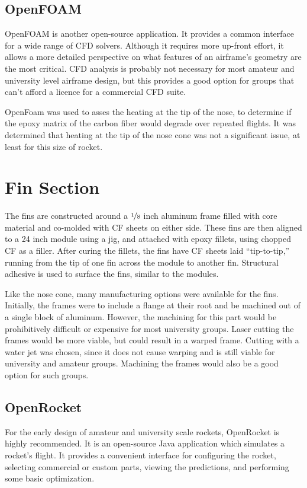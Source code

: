 \documentclass{aiaa-tc}%
\begin{document}
\subsection{OpenFOAM}
OpenFOAM is another open-source application. It provides a common interface for a wide range of CFD solvers.
Although it requires more up-front effort, it allows a more detailed perspective on what features of an airframe's geometry are the most critical. 
CFD analysis is probably not necessary for most amateur and university level airframe design, but this provides a good option for groups that can't afford a licence for a commercial CFD suite. 

OpenFoam was used to asses the heating at the tip of the nose, to determine if the epoxy matrix of the carbon fiber would degrade over repeated flights.
It was determined that heating at the tip of the nose cone was not a significant issue, at least for this size of rocket.

\section{Fin Section}

The fins are constructed around a $\nicefrac{1}{8}$ inch aluminum frame filled with core material and co-molded with CF sheets on either side. 
These fins are then aligned to a 24 inch module using a jig, and attached with epoxy fillets, using chopped CF as a filler. 
After curing the fillets, the fins have CF sheets laid ``tip-to-tip,'' running from the tip of one fin across the module to another fin. 
Structural adhesive is used to surface the fins, similar to the modules. 

Like the nose cone, many manufacturing options were available for the fins. 
Initially, the frames were to include a flange at their root and be machined out of a single block of aluminum. 
However, the machining for this part would be prohibitively difficult or expensive for most university groups. 
Laser cutting the frames would be more viable, but could result in a warped frame.
Cutting with a water jet was chosen, since it does not cause warping and is still viable for university and amateur groups. 
Machining the frames would also be a good option for such groups. 

\subsection{OpenRocket}
For the early design of amateur and university scale rockets, OpenRocket\cite{OR} is highly recommended. 
It is an open-source Java application which simulates a rocket's flight. It provides a convenient interface for configuring the rocket, selecting commercial or custom parts, viewing the predictions, and performing some basic optimization. 
\end{document}
